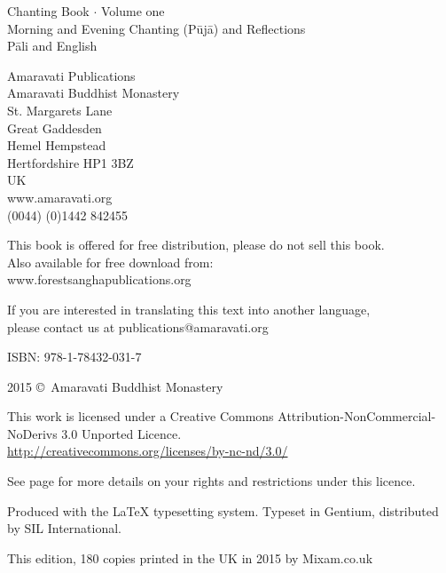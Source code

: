 
\thispagestyle{empty}

{\centering\small

Chanting Book $\cdot$ Volume one\\
Morning and Evening Chanting (Pūjā) and Reflections\\
Pāli and English

Amaravati Publications\\
Amaravati Buddhist Monastery\\
St. Margarets Lane\\
Great Gaddesden\\
Hemel Hempstead\\
Hertfordshire HP1 3BZ\\
UK\\
www.amaravati.org\\
(0044) (0)1442 842455

This book is offered for free distribution, please do not sell this book.\\
Also available for free download from:\\
www.forestsanghapublications.org

If you are interested in translating this text into another language,\\
please contact us at publications@amaravati.org

ISBN: 978-1-78432-031-7

2015 \copyright\ Amaravati Buddhist Monastery

This work is licensed under a Creative Commons Attribution-NonCommercial-NoDerivs 3.0 Unported Licence.\\
\href{http://creativecommons.org/licenses/by-nc-nd/3.0/}{http://creativecommons.org/licenses/by-nc-nd/3.0/}

See page \pageref{copyright-details} for more details on your rights and restrictions under this licence.

Produced with the {\selectfont\LaTeX} typesetting system. Typeset in Gentium, distributed by SIL International.

This edition, 180 copies printed in the UK in 2015 by Mixam.co.uk

}

